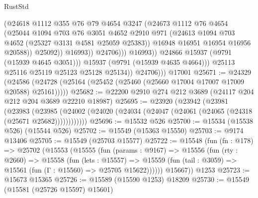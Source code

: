 \begin{lexlean}{RustStd}
\begin{coremodule}
                                  (@24618
                                    @1112
                                    @355
                                    @76
                                    @79
                                    @4654
                                    @3247
                                    (@24673
                                      @1112
                                      @76
                                      @4654
                                      (@25044
                                        @1094
                                        @703
                                        @76
                                        @3051
                                        @4652
                                        @2910
                                        @971
                                        (@24613 @1094 @703 @4652 (@25327 @3131 @4581 @25059 @25383))
                                        @16948
                                        @16951
                                        @16954
                                        @16956
                                        @20588))
                                    @25092))
                                @16993))
                            @24706)))
                      @16993))
                  @24866
                  @15937
                  (@9791 (@15939 @4645 @3051)))
                @15937
                (@9791 (@15939 @4635 @4664)))
              @25113
              @25116
              @25119
              @25123
              @25128
              @25134))
          @24706)))
    @17001
@25671 := @24329
    (@24586 (@24728 (@25164 (@25452 (@25460 (@25660 @17004 @17007 @17009 @20588) @25161)))))
@25682 := @22200 @2910 @274 @212 @3689 (@24117 @204 @212 @204 @3689 @22210 @18987)
@25695 := @23920
    (@23942
      (@23981
        (@23983
          (@23985 (@24002 (@24020 (@24034 (@24047 (@24061 (@24065 (@24318 (@25671 @25682))))))))))))
@25696 := @15532 @526
@25700 := @15534 (@15538 @526) (@15544 @526)
@25702 := @15549 (@15363 @15550)
@25703 := @9174 @13406
@25705 := @15549 (@25703 @15577)
@25722 := @15548
    (fun (fn : @178) =>
    @25702
      (@15553
        (@15555
          (fun (params : @9167) =>
          @15556
            (fun (rty : @2660) =>
            @15558
              (fun (lets : @15557) =>
              @15559 (fun (tail : @3059) => @15561 (fun (Γ : @15560) => @25705 @15622))))))
        @15667))
    @1253
@25723 := @15673 @15365
@25726 := @15589 (@15590 @1253) @18209
@25730 := @15549 (@15581 (@25726 @15597) @15601)

\end{coremodule}
\end{lexlean}
